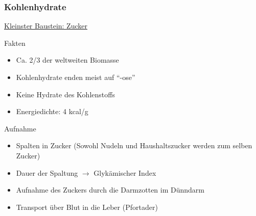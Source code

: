 \documentclass[xcolor=dvipsnames]{beamer}
\begin{document}
    \begin{frame}[allowframebreaks]
        \frametitle{Kohlenhydrate}

        \underline{Kleinster Baustein: Zucker}
        \begin{block}{Fakten}
            \begin{itemize}
                \setlength\itemsep{1em}
                \item Ca. 2/3 der weltweiten Biomasse
                \item Kohlenhydrate enden meist auf "`-ose"'
                \item Keine Hydrate des Kohlenstoffs
                \item Energiedichte: 4 kcal/g
            \end{itemize}
        \end{block}

        \framebreak

        \begin{block}{Aufnahme}
            \begin{itemize}
                \setlength\itemsep{1em}
                \item Spalten in Zucker (Sowohl Nudeln und Haushaltszucker werden zum selben Zucker)
                \item Dauer der Spaltung $\rightarrow$ Glykämischer Index
                \item Aufnahme des Zuckers durch die Darmzotten im Dünndarm
                \item Transport über Blut in die Leber (Pfortader)
            \end{itemize}
        \end{block}
    \end{frame}
\end{document}
